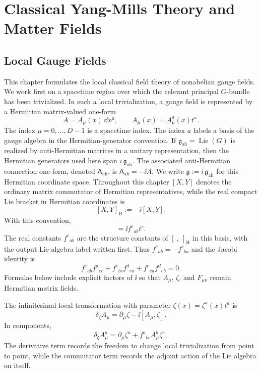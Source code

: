 \chapter{Classical Yang-Mills Theory and Matter Fields}
\label{ch:vol2-classical-yang-mills-matter}
\ConventionsLorentzian


\section{Local Gauge Fields}

This chapter formulates the local classical field theory of nonabelian gauge
fields.  We work first on a spacetime region over which the relevant principal
\(G\)-bundle has been trivialized.  In such a local trivialization, a gauge
field is represented by a Hermitian matrix-valued one-form
\[
  A=A_\mu(x)\,\dd x^\mu,
  \qquad
  A_\mu(x)=A^a_\mu(x)t^a .
\]
The index \(\mu=0,\ldots,D-1\) is a spacetime index.  The index \(a\) labels a
basis of the gauge algebra in the Hermitian-generator convention.  If
\(\mathfrak g_{\mathrm{ah}}=\operatorname{Lie}(G)\) is realized by
anti-Hermitian matrices in a unitary representation, then the Hermitian
generators used here span \(i\,\mathfrak g_{\mathrm{ah}}\).  The associated
anti-Hermitian connection one-form, denoted \(\mathsf A_{\mathrm{ah}}\), is
\(\mathsf A_{\mathrm{ah}}=-\ii A\).  We write
\(\mathfrak g:=i\,\mathfrak g_{\mathrm{ah}}\) for this Hermitian coordinate
space.  Throughout this chapter \([X,Y]\) denotes the ordinary matrix
commutator of Hermitian representatives, while the real compact Lie bracket in
Hermitian coordinates is
\[
  [X,Y]_{\mathrm H}:=-\ii[X,Y].
\]
With this convention,
\begin{equation}
  [t^a,t^b]=\ii f^c{}_{ab}t^c .
  \label{eq:ym-lie-algebra-conventions}
\end{equation}
The real constants \(f^c{}_{ab}\) are the structure constants of
\([\ ,\ ]_{\mathrm H}\) in this basis, with the output Lie-algebra label written
first.  Thus \(f^c{}_{ab}=-f^c{}_{ba}\) and the Jacobi identity is
\[
  f^e{}_{ab}f^d{}_{ec}
  +f^e{}_{bc}f^d{}_{ea}
  +f^e{}_{ca}f^d{}_{eb}=0 .
\]
Formulas below include explicit factors of \(\ii\) so that \(A_\mu\),
\(\zeta\), and \(F_{\mu\nu}\) remain Hermitian matrix fields.

The infinitesimal local transformation with parameter
\(\zeta(x)=\zeta^a(x)t^a\) is
\begin{equation}
  \delta_\zeta A_\mu
  =
  \partial_\mu\zeta-\ii[A_\mu,\zeta].
  \label{eq:ym-infinitesimal-gauge-transformation}
\end{equation}
In components,
\begin{equation}
  \delta_\zeta A^a_\mu
  =
  \partial_\mu\zeta^a+f^a{}_{bc}A^b_\mu\zeta^c,
  \label{eq:ym-infinitesimal-component-transformation}
\end{equation}
The derivative term records the freedom to change local trivialization from
point to point, while the commutator term records the adjoint action of the Lie
algebra on itself.

